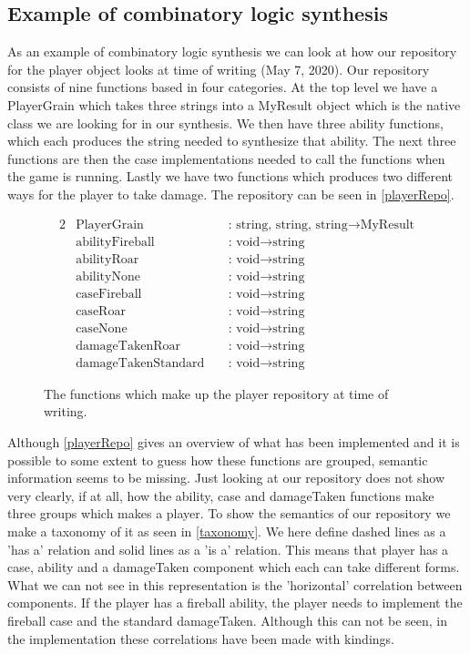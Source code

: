 \subsection{Example of combinatory logic synthesis}
As an example of combinatory logic synthesis we can look at how our repository for the player object looks at time of writing (May 7, 2020). Our repository consists of nine functions based in four categories. At the top level we have a PlayerGrain which takes three strings into a MyResult object which is the native class we are looking for in our synthesis. We then have three ability functions, which each produces the string needed to synthesize that ability. The next three functions are then the case implementations needed to call the functions when the game is running. Lastly we have two functions which produces two different ways for the player to take damage. The repository can be seen in \autoref{playerRepo}.
\begin{figure}[H]
	\centering
	\begin{alignat*}{2}
	&\text{PlayerGrain}\; &&\text{: string, string, string} \to \text{MyResult}\\
	&\text{abilityFireball}\; &&\text{: void} \to \text{string}\\
	&\text{abilityRoar}\; &&\text{: void} \to \text{string}\\
	&\text{abilityNone}\; &&\text{: void} \to \text{string}\\
	&\text{caseFireball}\; &&\text{: void} \to \text{string}\\
	&\text{caseRoar}\; &&\text{: void} \to \text{string}\\
	&\text{caseNone}\; &&\text{: void} \to \text{string}\\
	&\text{damageTakenRoar}\; &&\text{: void} \to \text{string}\\
	&\text{damageTakenStandard}\; &&\text{: void} \to \text{string}
	\end{alignat*}
	\caption{The functions which make up the player repository at time of writing.}
	\label{playerRepo}
\end{figure}
Although \autoref{playerRepo} gives an overview of what has been implemented and it is possible to some extent to guess how these functions are grouped, semantic information seems to be missing. Just looking at our repository does not show very clearly, if at all, how the ability, case and damageTaken functions make three groups which makes a player. To show the semantics of our repository we make a taxonomy of it as seen in \autoref{taxonomy}. We here define dashed lines as a 'has a' relation and solid lines as a 'is a' relation. This means that player has a case, ability and a damageTaken component which each can take different forms. What we can not see in this representation is the 'horizontal' correlation between components. If the player has a fireball ability, the player needs to implement the fireball case and the standard damageTaken. Although this can not be seen, in the implementation these correlations have been made with kindings.


